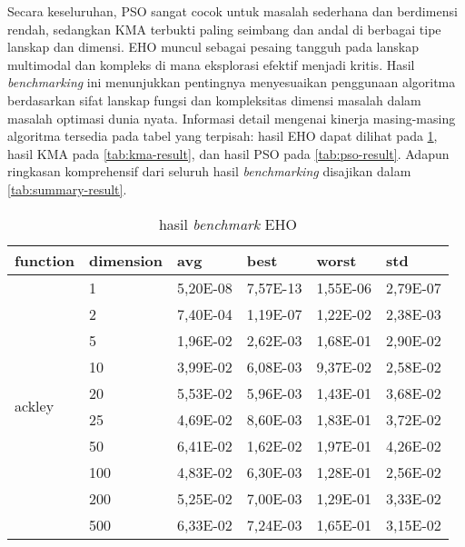 Secara keseluruhan, PSO sangat cocok untuk masalah sederhana dan berdimensi rendah, sedangkan KMA terbukti paling seimbang dan andal di berbagai tipe lanskap dan dimensi. EHO muncul sebagai pesaing tangguh pada lanskap multimodal dan kompleks di mana eksplorasi efektif menjadi kritis. Hasil \textit{benchmarking} ini menunjukkan pentingnya menyesuaikan penggunaan algoritma berdasarkan sifat lanskap fungsi dan kompleksitas dimensi masalah dalam masalah optimasi dunia nyata. Informasi detail mengenai kinerja masing-masing algoritma tersedia pada tabel yang terpisah: hasil EHO dapat dilihat pada \cref{tab:eho-result}, hasil KMA pada \cref{tab:kma-result}, dan hasil PSO pada \cref{tab:pso-result}. Adapun ringkasan komprehensif dari seluruh hasil \textit{benchmarking} disajikan dalam \cref{tab:summary-result}.

\begin{longtable}[c]{|p{3.5cm}|l|l|l|l|l|}
\caption{hasil \textit{benchmark} EHO}
\label{tab:eho-result}\\
\hline
function                               & dimension & avg      & best     & worst    & std      \\ \hline
\endfirsthead
%
\endhead
%
\multirow[t]{10}{*}{ackley}               & 1         & 5,20E-08 & 7,57E-13 & 1,55E-06 & 2,79E-07 \\ \cline{2-6} 
                                       & 2         & 7,40E-04 & 1,19E-07 & 1,22E-02 & 2,38E-03 \\ \cline{2-6} 
                                       & 5         & 1,96E-02 & 2,62E-03 & 1,68E-01 & 2,90E-02 \\ \cline{2-6} 
                                       & 10        & 3,99E-02 & 6,08E-03 & 9,37E-02 & 2,58E-02 \\ \cline{2-6} 
                                       & 20        & 5,53E-02 & 5,96E-03 & 1,43E-01 & 3,68E-02 \\ \cline{2-6} 
                                       & 25        & 4,69E-02 & 8,60E-03 & 1,83E-01 & 3,72E-02 \\ \cline{2-6} 
                                       & 50        & 6,41E-02 & 1,62E-02 & 1,97E-01 & 4,26E-02 \\ \cline{2-6} 
                                       & 100       & 4,83E-02 & 6,30E-03 & 1,28E-01 & 2,56E-02 \\ \cline{2-6} 
                                       & 200       & 5,25E-02 & 7,00E-03 & 1,29E-01 & 3,33E-02 \\ \cline{2-6} 
                                       & 500       & 6,33E-02 & 7,24E-03 & 1,65E-01 & 3,15E-02 \\ \hline

\end{longtable}
